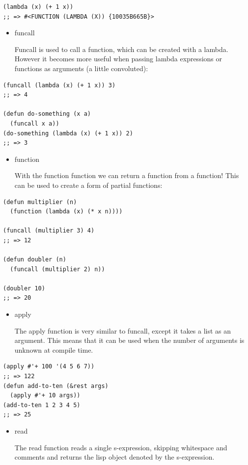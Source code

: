 \documentclass[11pt]{article}
\begin{document}
\begin{verbatim}
(lambda (x) (+ 1 x))
;; => #<FUNCTION (LAMBDA (X)) {10035B665B}>
\end{verbatim}

\begin{itemize}
\item funcall

Funcall is used to call a function, which can be created with a
lambda.  However it becomes more useful when passing lambda expressions or
functions as arguments (a little convoluted):
\end{itemize}

\begin{verbatim}
(funcall (lambda (x) (+ 1 x)) 3)
;; => 4

(defun do-something (x a)
  (funcall x a))
(do-something (lambda (x) (+ 1 x)) 2)
;; => 3
\end{verbatim}

\begin{itemize}
\item function

With the function function we can return a function from a
function! This can be used to create a form of partial functions:
\end{itemize}

\begin{verbatim}
(defun multiplier (n)
  (function (lambda (x) (* x n))))

(funcall (multiplier 3) 4)
;; => 12

(defun doubler (n)
  (funcall (multiplier 2) n))

(doubler 10)
;; => 20
\end{verbatim}

\begin{itemize}
\item apply

The apply function is very similar to funcall, except it takes a
list as an argument. This means that it can be used when the
number of arguments is unknown at compile time.
\end{itemize}

\begin{verbatim}
(apply #'+ 100 '(4 5 6 7))
;; => 122
(defun add-to-ten (&rest args)
  (apply #'+ 10 args))
(add-to-ten 1 2 3 4 5)
;; => 25
\end{verbatim}

\begin{itemize}
\item read

The read function reads a single s-expression, skipping whitespace
and comments and returns the lisp object denoted by the
s-expression.
\end{itemize}
\end{document}

